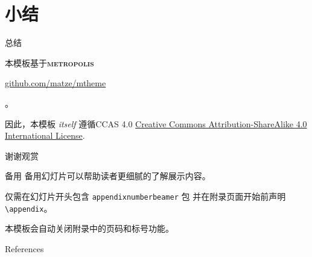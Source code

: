 \documentclass[10pt]{beamer}
\newcommand{\themename}{\textbf{\textsc{metropolis}}\xspace}
\begin{document}
\section{小结}

\begin{frame}{总结}

  本模板基于\themename

  \begin{center}\url{github.com/matze/mtheme}\end{center}。

 因此，本模板 \emph{itself} 遵循CCAS 4.0
  \href{http://creativecommons.org/licenses/by-sa/4.0/}{Creative Commons
  Attribution-ShareAlike 4.0 International License}.

  \begin{center}\ccbysa\end{center}

\end{frame}

\begin{frame}[standout]
   \Huge{谢谢观赏}
\end{frame}

\appendix

\begin{frame}[fragile]{备用}
  备用幻灯片可以帮助读者更细腻的了解展示内容。

  仅需在幻灯片开头包含 \verb|appendixnumberbeamer|
  包 并在附录页面开始前声明\verb|\appendix|。

  本模板会自动关闭附录中的页码和标号功能。
\end{frame}

\begin{frame}[allowframebreaks]{References}

  
  

\end{frame}
\end{document}
